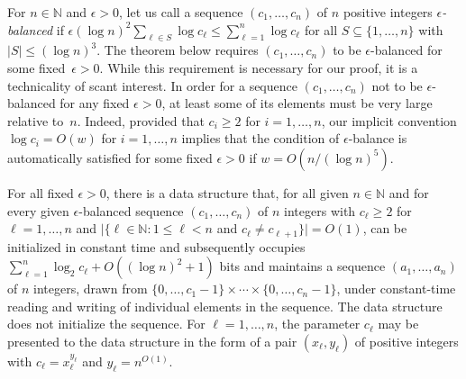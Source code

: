 \documentclass[envcountsame,envcountsect,undated,nolinenumbers]{lnthi}
\def\TbbbN{\mathbb{N}}
\begin{document}
For $n\in\TbbbN$ and $\epsilon>0$, let us call a sequence
$(c_1,\ldots,c_n)$ of $n$ positive integers 
\emph{$\epsilon$-balanced} if
$\epsilon (\log n)^2\sum_{\ell\in S}\log c_\ell
\le\sum_{\ell=1}^n\log c_\ell$
for all $S\subseteq\{1,\ldots,n\}$ with $|S|\le(\log n)^3$.
The theorem below requires $(c_1,\ldots,c_n)$ to
be $\epsilon$-balanced for some fixed~$\epsilon>0$.
While this requirement is necessary for our proof,
it is a technicality of scant interest.
In order for a sequence $(c_1,\ldots,c_n)$ not to be
$\epsilon$-balanced for any fixed $\epsilon>0$, at least some of
its elements must be very large relative to~$n$.
Indeed, provided that $c_i\ge 2$ for $i=1,\ldots,n$,
our implicit convention
$\log c_i=O(w)$ for $i=1,\ldots,n$ implies
that the condition of $\epsilon$-balance is
automatically satisfied for some fixed $\epsilon>0$ if
$w=O({n/{(\log n)^5}})$.

\begin{theorem}
\label{thm:succincter}For all fixed $\epsilon>0$,
there is a data structure
that, for all given $n\in\TbbbN$
and for every given
$\epsilon$-balanced sequence
$(c_1,\ldots,c_n)$ of $n$ integers
with $c_\ell\ge 2$ for $\ell=1,\ldots,n$
and $|\{\ell\in\TbbbN:1\le\ell<n$ and
$c_\ell\not= c_{\ell+1}\}|=O(1)$,
can be initialized in constant time and subsequently
occupies $\sum_{\ell=1}^n\log_2 c_\ell+O((\log n)^2+1)$ bits
and maintains a sequence
$(a_1,\ldots,a_n)$ of $n$ integers,
drawn from
$\{0,\ldots,c_1-1\}\times\cdots\times\{0,\ldots,c_n-1\}$,
under constant-time reading and writing
of individual elements in the sequence.
The data structure does not initialize the sequence.
For $\ell=1,\ldots,n$, the parameter $c_\ell$ may be presented
to the data structure in the form of a pair $(x_\ell,y_\ell)$
of positive integers with $c_\ell=x_\ell^{y_\ell}$ and
$y_\ell=n^{O(1)}$.
\end{theorem}
\end{document}
